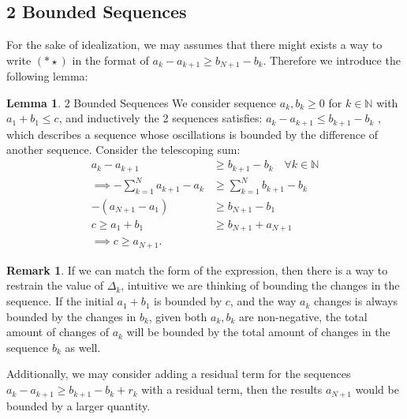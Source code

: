 \documentclass[]{article}
\theoremstyle{definition}
\newtheorem{lemma}{Lemma}[subsection]  %
\newtheorem{remark}{Remark}[subsection]
{
    \newtheorem{assumption}{Assumption}
}
\begin{document}
    \subsection{2 Bounded Sequences}
        For the sake of idealization, we may assumes that there might exists a way to write $(*\star)$ in the format of $a_k- a_{k + 1}\ge b_{N+ 1} - b_k$. Therefore we introduce the following lemma: 
        \begin{lemma}{2 Bounded Sequences}
            We consider sequence $a_k, b_k \ge 0$ for $k\in \mathbb N$ with $a_1 + b_1 \le c$, and inductively the 2 sequences satisfies: $a_{k} - a_{k + 1} \le b_{k + 1} - b_k$ , which describes a sequence whose oscillations is bounded by the difference of another sequence. Consider the telescoping sum: 
            \begin{align*}
                a_{k} - a_{k + 1} 
                &\ge b_{k + 1} - b_k \quad \forall k \in \mathbb N
                \\
                \implies
                -\sum_{k = 1}^{N}
                a_{k + 1} - a_k 
                &\ge 
                \sum_{k = 1}^{N} b_{k + 1} - b_k
                \\
                - (a_{N + 1} - a_1) 
                &\ge b_{N + 1} - b_1
                \\
                c\ge a_1 + b_1
                &\ge
                b_{N + 1} + a_{N +1}
                \\
                \implies c \ge a_{N+1}. 
            \end{align*}
        \end{lemma}
        \begin{remark}
            If we can match the form of the expression, then there is a way to restrain the value of $\Delta_k$, intuitive we are thinking of bounding the changes in the sequence. If the initial $a_1 + b_1$  is bounded by $c$, and the way $a_k$ changes is always bounded by the changes in $b_k$, given both $a_k, b_k$ are non-negative, the total amount of changes of $a_k$ will be bounded by the total amount of changes in the sequence $b_k$ as well. 
            \par
            Additionally, we may consider adding a residual term for the sequences $a_{k} - a_{k + 1} \ge b_{k + 1} - b_k + r_k$ with a residual term, then the results $a_{N + 1}$ would be bounded by a larger quantity.
        \end{remark}
\end{document}

